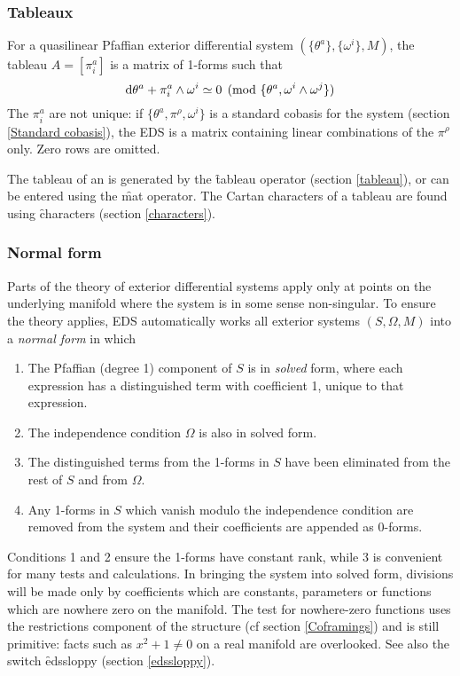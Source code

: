 \subsubsection{Tableaux}
\label{Tableaux}

For a quasilinear Pfaffian exterior differential system
$(\{\theta^a\},\{\omega^i\},M)$, the tableau $A=[\pi^a_i]$
is a matrix of 1-forms such that
\[	\mathrm{d} \theta^a + \pi^a_i\wedge\omega^i \simeq 0 
		\pmod{\{\theta^a,\omega^i\wedge\omega^j\}}
\]
The $\pi^a_i$ are not unique: if $\{\theta^a,\pi^\rho,\omega^i\}$ is a
standard cobasis for the system (section \ref{Standard cobasis}), the EDS
 is a matrix containing linear combinations of the $\pi^\rho$
only. Zero rows are omitted.

The tableau of an  is generated by the \f{tableau} operator
(section \ref{tableau}), or can be entered using the \f{mat} operator. The
Cartan characters of a tableau are found using \f{characters} (section
\ref{characters}).

\subsubsection{Normal form}
\label{Normal form}

Parts of the theory of exterior differential systems apply only at points
on the underlying manifold where the system is in some sense
non-singular. To ensure the theory applies, EDS automatically works all
exterior systems $(S,\Omega,M)$ into a {\em normal form} in which

\begin{enumerate}
\item The Pfaffian (degree 1) component of $S$ is in {\em solved} form,
      where each expression has a distinguished term with coefficient 1,
      unique to that expression.
\item The independence condition $\Omega$ is also in solved form.
\item The distinguished terms from the 1-forms in $S$ have been eliminated
      from the rest of $S$ and from $\Omega$.
\item Any 1-forms in $S$ which vanish modulo the independence condition are
      removed from the system and their coefficients are appended as
      0-forms.
\end{enumerate}

Conditions 1 and 2 ensure the 1-forms have constant rank, while 3 is
convenient for many tests and calculations. In bringing the system into
solved form, divisions will be made only by coefficients which are
constants, parameters or functions which are nowhere zero on the
manifold. The test for nowhere-zero functions uses the restrictions
component of the  structure (cf section \ref{Coframings}) and
is still primitive: facts such as $x^2+1\neq0$ on a real manifold are
overlooked. See also the switch \f{edssloppy} (section \ref{edssloppy}).

